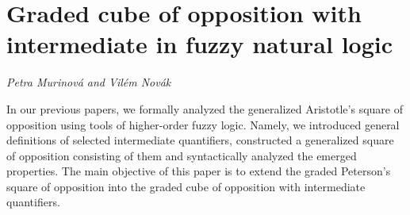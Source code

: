 \documentclass[../booklet.tex]{subfiles}
\begin{document}
\section[Graded cube of opposition with intermediate in fuzzy natural logic. {\it Petra Murinová and Vilém Novák}]{Graded cube of opposition with intermediate in fuzzy natural logic}
 

\begin{center}
  {\it Petra Murinová and Vilém Novák}
\end{center}

\vskip 0.8cm


In our previous papers, we formally analyzed the generalized Aristotle's square of opposition using tools of higher-order fuzzy logic. Namely, we introduced general definitions of selected intermediate quantifiers, constructed a generalized square of opposition consisting of them and syntactically analyzed the emerged properties. The main objective of this paper is to extend the graded Peterson's square of opposition into the graded cube of opposition with intermediate quantifiers.

\end{document}
